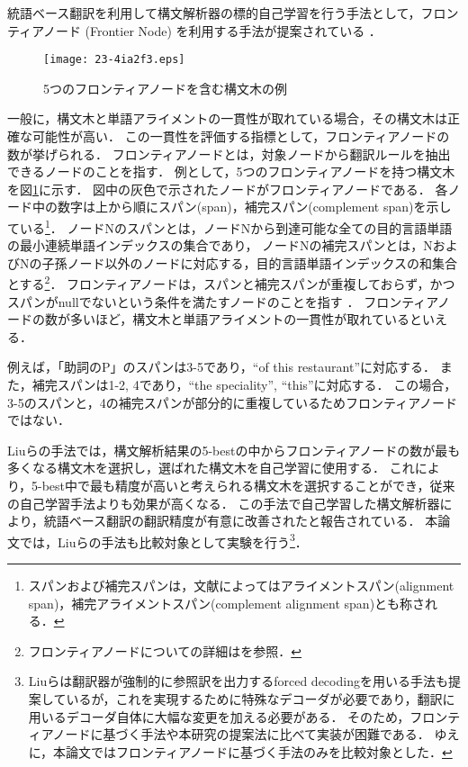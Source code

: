 \documentclass[japanese]{jnlp_1.4}
\begin{document}
統語ベース翻訳を利用して構文解析器の標的自己学習を行う手法として，フロンティアノード (Frontier Node) を利用する手法が提案されている \cite{liu12emnlp}．

\begin{figure}[b]
\begin{center}
\texttt{[image: 23-4ia2f3.eps]}
\end{center}
\caption{5つのフロンティアノードを含む構文木の例}
\label{fig:frontier_node_tree}
\end{figure}

一般に，構文木と単語アライメントの一貫性が取れている場合，その構文木は正確な可能性が高い．
この一貫性を評価する指標として，フロンティアノードの数が挙げられる．
フロンティアノードとは，対象ノードから翻訳ルールを抽出できるノードのことを指す．
例として，5つのフロンティアノードを持つ構文木を図\ref{fig:frontier_node_tree}に示す．
図中の灰色で示されたノードがフロンティアノードである．
各ノード中の数字は上から順にスパン(span)，補完スパン(complement span)を示している\footnote{スパンおよび補完スパンは，文献によってはアライメントスパン(alignment span)，補完アライメントスパン(complement alignment span)とも称される．}．
ノードNのスパンとは，ノードNから到達可能な全ての目的言語単語の最小連続単語インデックスの集合であり，
ノードNの補完スパンとは，NおよびNの子孫ノード以外のノードに対応する，目的言語単語インデックスの和集合とする\footnote{フロンティアノードについての詳細は\cite{galley06syntaxmt}を参照．}．
フロンティアノードは，スパンと補完スパンが重複しておらず，かつスパンがnullでないという条件を満たすノードのことを指す \cite{galley06syntaxmt}．
フロンティアノードの数が多いほど，構文木と単語アライメントの一貫性が取れているといえる．

例えば，「助詞のP」のスパンは3-5であり，``of this restaurant''に対応する．
また，補完スパンは1-2, 4であり，``the speciality'', ``this''に対応する．
この場合，3-5のスパンと，4の補完スパンが部分的に重複しているためフロンティアノードではない．

Liuらの手法では，構文解析結果の5-bestの中からフロンティアノードの数が最も多くなる構文木を選択し，選ばれた構文木を自己学習に使用する．
これにより，5-best中で最も精度が高いと考えられる構文木を選択することができ，従来の自己学習手法よりも効果が高くなる．
この手法で自己学習した構文解析器により，統語ベース翻訳の翻訳精度が有意に改善されたと報告されている．
本論文では，Liuらの手法も比較対象として実験を行う\footnote{
Liuらは翻訳器が強制的に参照訳を出力するforced decodingを用いる手法も提案しているが，これを実現するために特殊なデコーダが必要であり，翻訳に用いるデコーダ自体に大幅な変更を加える必要がある．
そのため，フロンティアノードに基づく手法や本研究の提案法に比べて実装が困難である．
ゆえに，本論文ではフロンティアノードに基づく手法のみを比較対象とした．}．
\end{document}
